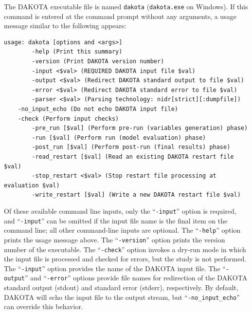 The DAKOTA executable file is named {\tt dakota} ({\tt dakota.exe} on
Windows). If this command is entered at the command prompt without any
arguments, a usage message similar to the following appears:
\begin{small}
\begin{verbatim}
usage: dakota [options and <args>]
        -help (Print this summary)
        -version (Print DAKOTA version number)
        -input <$val> (REQUIRED DAKOTA input file $val)
        -output <$val> (Redirect DAKOTA standard output to file $val)
        -error <$val> (Redirect DAKOTA standard error to file $val)
        -parser <$val> (Parsing technology: nidr[strict][:dumpfile])
	-no_input_echo (Do not echo DAKOTA input file)
	-check (Perform input checks)
        -pre_run [$val] (Perform pre-run (variables generation) phase)
        -run [$val] (Perform run (model evaluation) phase)
        -post_run [$val] (Perform post-run (final results) phase)
        -read_restart [$val] (Read an existing DAKOTA restart file $val)
        -stop_restart <$val> (Stop restart file processing at evaluation $val)
        -write_restart [$val] (Write a new DAKOTA restart file $val)
\end{verbatim}
\end{small}

Of these available command line inputs, only the ``\texttt{-input}''
option is required, and ``\texttt{-input}'' can be omitted if the
input file name is the final item on the command line; all other
command-line inputs are optional. The ``\texttt{-help}'' option prints
the usage message above. The ``\texttt{-version}'' option prints the
version number of the executable. The ``\texttt{-check}'' option
invokes a dry-run mode in which the input file is processed and
checked for errors, but the study is not performed. The
``\texttt{-input}'' option provides the name of the DAKOTA input file.
The ``\texttt{-output}'' and ``\texttt{-error}'' options provide file
names for redirection of the DAKOTA standard output (stdout) and
standard error (stderr), respectively.  By default, DAKOTA will echo
the input file to the output stream, but ``\texttt{-no\_input\_echo}''
can override this behavior.

